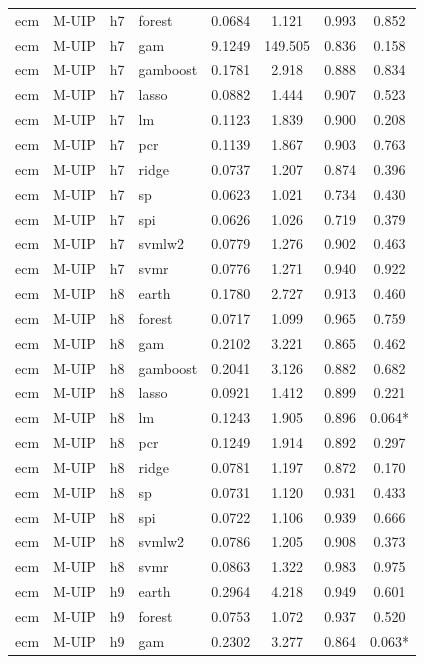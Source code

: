 \begin{ThreePartTable}
\begin{longtable}[t]{llclcccc}
ecm & M-UIP & h7 & forest & 0.0684 & 1.121 & 0.993 & 0.852\\
ecm & M-UIP & h7 & gam & 9.1249 & 149.505 & 0.836 & 0.158\\
ecm & M-UIP & h7 & gamboost & 0.1781 & 2.918 & 0.888 & 0.834\\
ecm & M-UIP & h7 & lasso & 0.0882 & 1.444 & 0.907 & 0.523\\
ecm & M-UIP & h7 & lm & 0.1123 & 1.839 & 0.900 & 0.208\\
ecm & M-UIP & h7 & pcr & 0.1139 & 1.867 & 0.903 & 0.763\\
ecm & M-UIP & h7 & ridge & 0.0737 & 1.207 & 0.874 & 0.396\\
ecm & M-UIP & h7 & sp & 0.0623 & 1.021 & 0.734 & 0.430\\
ecm & M-UIP & h7 & spi & 0.0626 & 1.026 & 0.719 & 0.379\\
ecm & M-UIP & h7 & svmlw2 & 0.0779 & 1.276 & 0.902 & 0.463\\
ecm & M-UIP & h7 & svmr & 0.0776 & 1.271 & 0.940 & 0.922\\
\addlinespace
ecm & M-UIP & h8 & earth & 0.1780 & 2.727 & 0.913 & 0.460\\
ecm & M-UIP & h8 & forest & 0.0717 & 1.099 & 0.965 & 0.759\\
ecm & M-UIP & h8 & gam & 0.2102 & 3.221 & 0.865 & 0.462\\
ecm & M-UIP & h8 & gamboost & 0.2041 & 3.126 & 0.882 & 0.682\\
ecm & M-UIP & h8 & lasso & 0.0921 & 1.412 & 0.899 & 0.221\\
ecm & M-UIP & h8 & lm & 0.1243 & 1.905 & 0.896 & 0.064*\\
ecm & M-UIP & h8 & pcr & 0.1249 & 1.914 & 0.892 & 0.297\\
ecm & M-UIP & h8 & ridge & 0.0781 & 1.197 & 0.872 & 0.170\\
ecm & M-UIP & h8 & sp & 0.0731 & 1.120 & 0.931 & 0.433\\
ecm & M-UIP & h8 & spi & 0.0722 & 1.106 & 0.939 & 0.666\\
ecm & M-UIP & h8 & svmlw2 & 0.0786 & 1.205 & 0.908 & 0.373\\
ecm & M-UIP & h8 & svmr & 0.0863 & 1.322 & 0.983 & 0.975\\
\addlinespace
ecm & M-UIP & h9 & earth & 0.2964 & 4.218 & 0.949 & 0.601\\
ecm & M-UIP & h9 & forest & 0.0753 & 1.072 & 0.937 & 0.520\\
ecm & M-UIP & h9 & gam & 0.2302 & 3.277 & 0.864 & 0.063*\\

\end{longtable}
\end{ThreePartTable}
